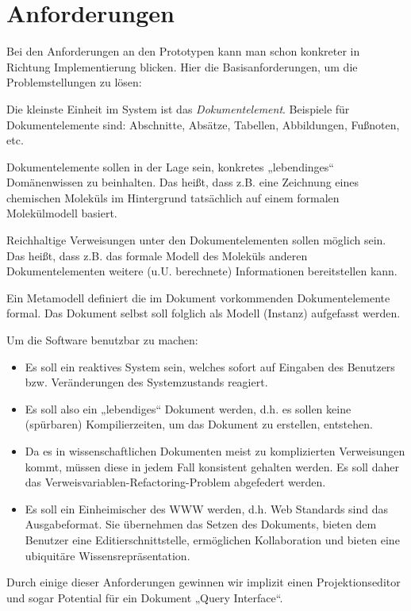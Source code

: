 \section{Anforderungen}\label{anforderungen-sec}
 
Bei den Anforderungen an den Prototypen kann man schon konkreter in Richtung Implementierung blicken. Hier die Basisanforderungen, um die Problemstellungen zu lösen:

 
Die kleinste Einheit im System ist das \emph{Dokumentelement}. Beispiele für Dokumentelemente sind: Abschnitte, Absätze, Tabellen, Abbildungen, Fußnoten, etc.

 
Dokumentelemente sollen in der Lage sein, konkretes „lebendinges“ Domänenwissen zu beinhalten. Das heißt, dass z.B. eine Zeichnung eines chemischen Moleküls im Hintergrund tatsächlich auf einem formalen Molekülmodell basiert.

 
Reichhaltige Verweisungen unter den Dokumentelementen sollen möglich sein. Das heißt, dass z.B. das formale Modell des Moleküls anderen Dokumentelementen weitere (u.U. berechnete) Informationen bereitstellen kann.

 
Ein Metamodell definiert die im Dokument vorkommenden Dokumentelemente formal. Das Dokument selbst soll folglich als Modell (Instanz) aufgefasst werden.

 
Um die Software benutzbar zu machen:

 
\begin{itemize}

\item Es soll ein reaktives System sein, welches sofort auf Eingaben des Benutzers bzw. Veränderungen des Systemzustands reagiert.
\item Es soll also ein „lebendiges“ Dokument werden, d.h. es sollen keine (spürbaren) Kompilierzeiten, um das Dokument zu erstellen, entstehen.
\item Da es in wissenschaftlichen Dokumenten meist zu komplizierten Verweisungen kommt, müssen diese in jedem Fall konsistent gehalten werden. Es soll daher das Verweisvariablen-Refactoring-Problem abgefedert werden.
\item Es soll ein Einheimischer des WWW werden, d.h. Web Standards sind das Ausgabeformat. Sie übernehmen das Setzen des Dokuments, bieten dem Benutzer eine Editierschnittstelle, ermöglichen Kollaboration und bieten eine ubiquitäre Wissensrepräsentation.
\end{itemize}
 
Durch einige dieser Anforderungen gewinnen wir implizit einen Projektionseditor und sogar Potential für ein Dokument „Query Interface“.

